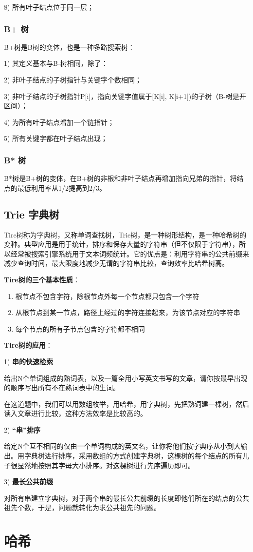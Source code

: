 \documentclass[UTF8,a4paper,12pt]{ctexbook}
\begin{document}
			8) 所有叶子结点位于同一层；
		
		\subsection{B+ 树}
			B+树是B树的变体，也是一种多路搜索树：
			
			1) 其定义基本与B-树相同，除了：
			
			2) 非叶子结点的子树指针与关键字个数相同；
			
			3) 非叶子结点的子树指针P[i]，指向关键字值属于[K[i], K[i+1])的子树（B-树是开区间）；
			
			4) 为所有叶子结点增加一个链指针；
			
			5) 所有关键字都在叶子结点出现；
			
		\subsection{B* 树}
			B*树是B+树的变体，在B+树的非根和非叶子结点再增加指向兄弟的指针，将结点的最低利用率从1/2提高到2/3。
		
			
		\section{Trie 字典树}	
			Tire树称为字典树，又称单词查找树，Trie树，是一种树形结构，是一种哈希树的变种。典型应用是用于统计，排序和保存大量的字符串（但不仅限于字符串），所以经常被搜索引擎系统用于文本词频统计。它的优点是：利用字符串的公共前缀来减少查询时间，最大限度地减少无谓的字符串比较，查询效率比哈希树高。　
			
			\textbf{Tire树的三个基本性质}：
				\begin{enumerate}[itemindent = 1em]
					\item 根节点不包含字符，除根节点外每一个节点都只包含一个字符
					\item 从根节点到某一节点，路径上经过的字符连接起来，为该节点对应的字符串
					\item 每个节点的所有子节点包含的字符都不相同
				\end{enumerate}

			\textbf{Tire树的应用}：

			1) \textbf{串的快速检索}
			
			给出N个单词组成的熟词表，以及一篇全用小写英文书写的文章，请你按最早出现的顺序写出所有不在熟词表中的生词。
			
			在这道题中，我们可以用数组枚举，用哈希，用字典树，先把熟词建一棵树，然后读入文章进行比较，这种方法效率是比较高的。
			
			2) \textbf{“串”排序}
			
			给定N个互不相同的仅由一个单词构成的英文名，让你将他们按字典序从小到大输出。用字典树进行排序，采用数组的方式创建字典树，这棵树的每个结点的所有儿子很显然地按照其字母大小排序。对这棵树进行先序遍历即可。
			
			3) \textbf{最长公共前缀}
			
			对所有串建立字典树，对于两个串的最长公共前缀的长度即他们所在的结点的公共祖先个数，于是，问题就转化为求公共祖先的问题。


\chapter{哈希}


  
		    
\end{document}
